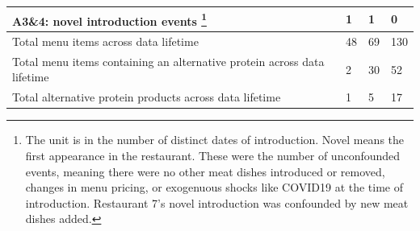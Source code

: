 \begin{longtable}{@{}V{3.0cm}V{\dimexpr(\linewidth-3.0cm-24pt)/3\relax}V{\dimexpr(\linewidth-3.0cm-24pt)/3\relax}V{\dimexpr(\linewidth-3.0cm-24pt)/3\relax}@{}}
\midrule[0.1pt]
A3\&4: novel introduction events \footnote{The unit is in the number of distinct dates of introduction. Novel means the first appearance in the restaurant. These were the number of unconfounded events, meaning there were no other meat dishes introduced or removed, changes in menu pricing, or exogenuous shocks like COVID19 at the time of introduction. Restaurant 7's novel introduction was confounded by new meat dishes added.} & 1 & 1 & 0 \\*
\midrule[0.1pt]
Total menu items across data lifetime & 48 & 69 & 130 \\*
\midrule[0.1pt]
Total menu items containing an alternative protein across data lifetime & 2 & 30 & 52 \\*
\midrule[0.1pt]
Total alternative protein products across data lifetime & 1 & 5 & 17 \\
\end{longtable}
\endgroup
